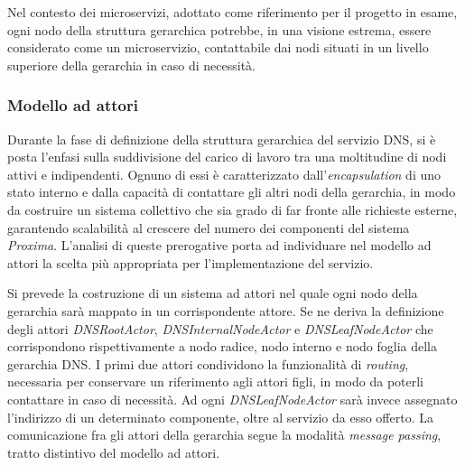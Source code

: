 \documentclass[a4paper,12pt]{report}
\begin{document}
Nel contesto dei microservizi, adottato come riferimento per il progetto in esame, ogni nodo della struttura gerarchica potrebbe, in una visione estrema, essere considerato come un microservizio, contattabile dai nodi situati in un livello superiore della gerarchia in caso di necessità.

\subsubsection{Modello ad attori}
Durante la fase di definizione della struttura gerarchica del servizio DNS, si è posta l'enfasi sulla suddivisione del carico di lavoro tra una moltitudine di nodi attivi e indipendenti. Ognuno di essi è caratterizzato dall'\emph{encapsulation} di uno stato interno e dalla capacità di contattare gli altri nodi della gerarchia, in modo da costruire un sistema collettivo che sia grado di far fronte alle richieste esterne, garantendo scalabilità al crescere del numero dei componenti del sistema \emph{Proxima}. L'analisi di queste prerogative porta ad individuare nel modello ad attori la scelta più appropriata per l'implementazione del servizio.

Si prevede la costruzione di un sistema ad attori nel quale ogni nodo della gerarchia sarà mappato in un corrispondente attore. Se ne deriva la definizione degli attori \emph{DNSRootActor}, \emph{DNSInternalNodeActor} e \emph{DNSLeafNodeActor} che corrispondono rispettivamente a nodo radice, nodo interno e nodo foglia della gerarchia DNS. I primi due attori condividono la funzionalità di \emph{routing}, necessaria per conservare un riferimento agli attori figli, in modo da poterli contattare in caso di necessità. Ad ogni \emph{DNSLeafNodeActor} sarà invece assegnato l'indirizzo di un determinato componente, oltre al servizio da esso offerto. La comunicazione fra gli attori della gerarchia segue la modalità \emph{message passing}, tratto distintivo del modello ad attori.
\end{document}
